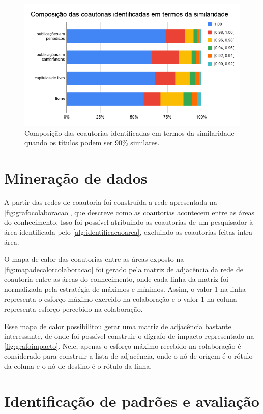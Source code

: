 \begin{figure}[htpb]
  \centering
  \includegraphics[scale=.5]{figuras/metodo-composicao-coautorias}
  \caption{Composição das coautorias identificadas em termos da similaridade quando os títulos podem ser 90\% similares.}
  \label{fig:composicaocoautorias}
\end{figure}

\section{Mineração de dados}

A partir das redes de coautoria foi construída a rede apresentada na \autoref{fig:grafocolaboracao}, que descreve como as coautorias acontecem entre as áreas do conhecimento. Isso foi possível atribuindo as coautorias de um pesquisador à área identificada pelo \autoref{alg:identificacaoarea}, excluindo as coautorias feitas intra-área.

O mapa de calor das coautorias entre as áreas exposto na \autoref{fig:mapadecalorcolaboracao} foi gerado pela matriz de adjacência da rede de coautoria entre as áreas do conhecimento, onde cada linha da matriz foi normalizada pela estratégia de máximos e mínimos. Assim, o valor 1 na linha representa o esforço máximo exercido na colaboração e o valor 1 na coluna representa esforço percebido na colaboração.

Esse mapa de calor possibilitou gerar uma matriz de adjacência bastante interessante, de onde foi possível construir o dígrafo de impacto representado na \autoref{fig:grafoimpacto}. Nele, apenas o esforço máximo recebido na colaboração é considerado para construir a lista de adjacência, onde o nó de origem é o rótulo da coluna e o nó de destino é o rótulo da linha.

\section{Identificação de padrões e avaliação}


